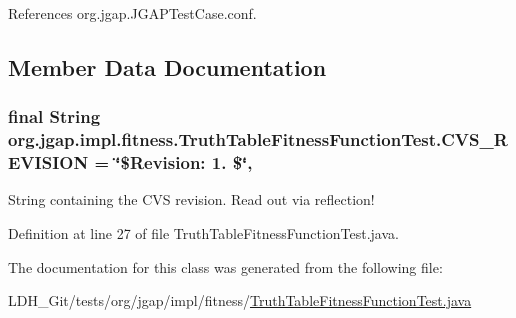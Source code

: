 References org.\-jgap.\-J\-G\-A\-P\-Test\-Case.\-conf.



\subsection{Member Data Documentation}
\hypertarget{classorg_1_1jgap_1_1impl_1_1fitness_1_1_truth_table_fitness_function_test_a9a93381bdd631e7ad548cfcc635b7163}{
\subsubsection[{C\-V\-S\-\_\-\-R\-E\-V\-I\-S\-I\-O\-N}]{\setlength{\rightskip}{0pt plus 5cm}final String org.\-jgap.\-impl.\-fitness.\-Truth\-Table\-Fitness\-Function\-Test.\-C\-V\-S\-\_\-\-R\-E\-V\-I\-S\-I\-O\-N = \char`\"{}\$Revision\-: 1. \$\char`\"{}\hspace{0.3cm}{\ttfamily [static]}, {\ttfamily [private]}}}\label{classorg_1_1jgap_1_1impl_1_1fitness_1_1_truth_table_fitness_function_test_a9a93381bdd631e7ad548cfcc635b7163}
String containing the C\-V\-S revision. Read out via reflection! 

Definition at line 27 of file Truth\-Table\-Fitness\-Function\-Test.\-java.



The documentation for this class was generated from the following file\-:\begin{DoxyCompactItemize}
\item 
L\-D\-H\-\_\-\-Git/tests/org/jgap/impl/fitness/\hyperlink{_truth_table_fitness_function_test_8java}{Truth\-Table\-Fitness\-Function\-Test.\-java}\end{DoxyCompactItemize}
